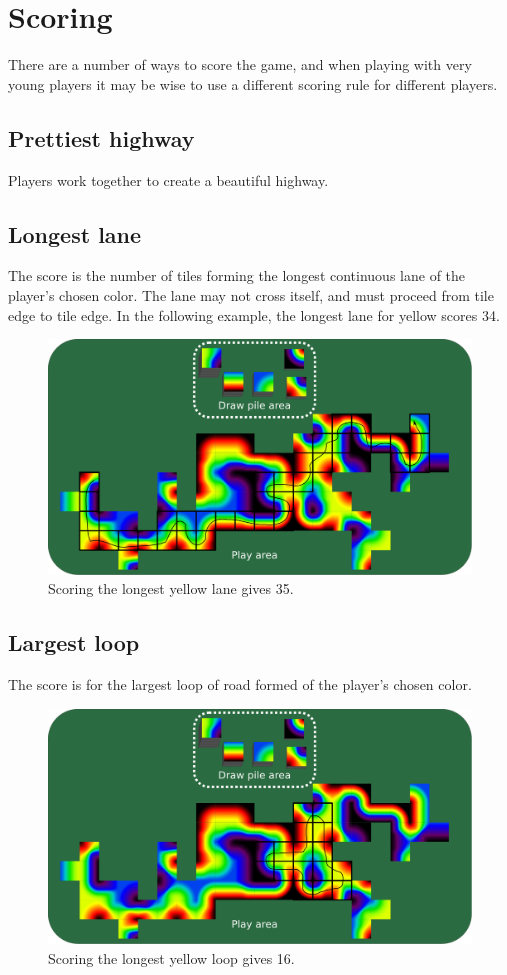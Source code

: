 \documentclass[twocolumn, 11pt]{article}
\begin{document}
\section*{Scoring}
There are a number of ways to score the game, and when playing with
very young players it may be wise to use a different scoring rule for
different players.
\subsection*{Prettiest highway}
Players work together to create a beautiful highway.
\subsection*{Longest lane}
The score is the number of tiles forming the longest continuous lane
of the player’s chosen color. The lane may not cross itself, and must
proceed from tile edge to tile edge.  In the following example, the
longest lane for yellow scores 34.

\begin{figure}[h]
  \includegraphics[width=\columnwidth]{scoring-longest}
  \caption{Scoring the longest yellow lane gives 35.}
\end{figure}

\subsection*{Largest loop}
The score is for the largest loop of road formed of the player’s
chosen color.

\begin{figure}[h]
  \includegraphics[width=\columnwidth]{scoring-loop}
  \caption{Scoring the longest yellow loop gives 16.}
\end{figure}
\end{document}
